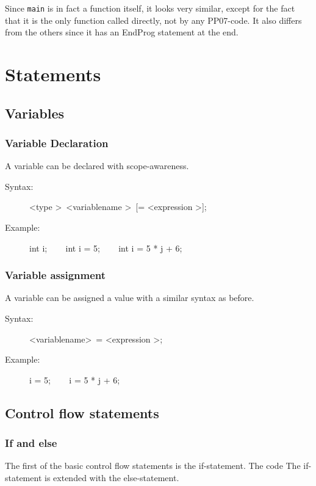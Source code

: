 \documentclass[10pt,a4paper]{report}
\begin{document}
Since \texttt{main} is in fact a function itself, it looks very similar, except for the fact that it is the only function called directly, not by any PP07-code. It also differs from the others since it has an EndProg statement at the end.

\section{Statements}

\subsection{Variables}

\subsubsection*{Variable Declaration}
A variable can be declared with scope-awareness.
\begin{description}
	\item[Syntax:] 
		\textless type \textgreater ~\textless variablename \textgreater ~[= \textless expression \textgreater];
	\item[Example:] 
		int i; ~~~ 
		int i = 5;  ~~~ 
		int i = 5 * j + 6;
\end{description} 


\subsubsection*{Variable assignment}
A variable can be assigned a value with a similar syntax as before.
\begin{description}
	\item[Syntax:] 
		\textless variablename\textgreater ~= \textless expression \textgreater;
	\item[Example:] 
		i = 5; ~~~ 
		i = 5 * j + 6;
\end{description} 

\subsection{Control flow statements}

\subsubsection*{If and else}
The first of the basic control flow statements is the if-statement. The code  The if-statement is extended with the else-statement.
\end{document}
